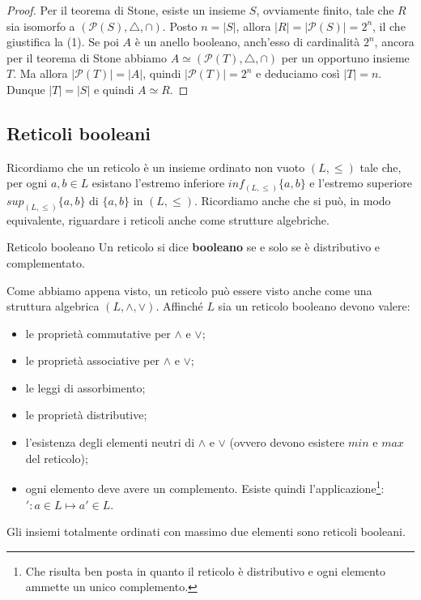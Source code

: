 \begin{proof}
	Per il teorema di Stone, esiste un insieme $S$, ovviamente finito, tale che $R$ sia isomorfo a $(\mathcal{P}(S),\triangle,\cap)$. Posto $n=|S|$, allora $|R| = |\mathcal{P}(S)| = 2^{n}$, il che giustifica la (1). Se poi $A$ è un anello booleano, anch'esso di cardinalità $2^{n}$, ancora per il teorema di Stone abbiamo $A \simeq (\mathcal{P}(T),\triangle,\cap)$ per un opportuno insieme $T$. Ma allora $|\mathcal{P}(T)| = |A|$, quindi $|\mathcal{P}(T)|=2^{n}$ e deduciamo così $|T|=n$. Dunque $|T|=|S|$ e quindi $A \simeq R$.
\end{proof}

\subsection{Reticoli booleani}
Ricordiamo che un reticolo è un insieme ordinato non vuoto $(L,\leq)$ tale che, per ogni $a,b \in L$ esistano l'estremo inferiore $inf_{(L,\leq)}\{a,b\}$ e l'estremo superiore $sup_{(L,\leq)}\{a,b\}$ di $\{a,b\}$ in $(L,\leq)$. Ricordiamo anche che si può, in modo equivalente, riguardare i reticoli anche come strutture algebriche.

\begin{defbox}{Reticolo booleano}
	Un reticolo si dice \textbf{booleano} se e solo se è distributivo e complementato.
\end{defbox}

Come abbiamo appena visto, un reticolo può essere visto anche come una struttura algebrica $(L,\wedge,\vee)$. Affinché $L$ sia un reticolo booleano devono valere:
\begin{itemize}
	\item le proprietà commutative per $\wedge$ e $\vee$;
	\item le proprietà associative per $\wedge$ e $\vee$;
	\item le leggi di assorbimento;
	\item le proprietà distributive;
	\item l'esistenza degli elementi neutri di $\wedge$ e $\vee$ (ovvero devono esistere $min$ e $max$ del reticolo);
	\item ogni elemento deve avere un complemento. Esiste quindi l'applicazione\footnote{Che risulta ben posta in quanto il reticolo è distributivo e ogni elemento ammette un unico complemento.}: $': a \in L \mapsto a' \in L$.
\end{itemize}
Gli insiemi totalmente ordinati con massimo due elementi sono reticoli booleani.

